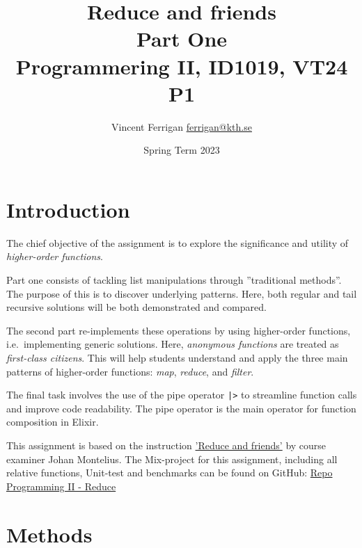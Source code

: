 \documentclass[a4paper,11pt]{article}
\begin{document}
\title{
    Reduce and friends
    \\Part One
\\\small{Programmering II, ID1019, VT24 P1}
}
\author{Vincent Ferrigan \href{mailto:ferrigan@kth.se}{ferrigan@kth.se}}

\date{Spring Term 2023}

\maketitle

\section*{Introduction}
\label{sec:introduction}
The chief objective of the assignment is to explore the significance and utility
of \emph{higher-order functions}.

Part one consists of tackling list manipulations through
''traditional methods''.
The purpose of this is to discover underlying patterns.
Here, both regular and tail recursive solutions will be both
demonstrated and compared.

The second part re-implements these operations by using higher-order functions,
i.e.\ implementing generic solutions.
Here, \emph{anonymous functions} are treated as \emph{first-class citizens}.
This will help students understand and apply the three main patterns of
higher-order functions: \emph{map}, \emph{reduce}, and \emph{filter}.

The final task involves the use of the pipe operator
\texttt{|>}
to streamline
function calls and improve code readability.
The pipe operator is the main operator for function composition in Elixir.

This assignment is based on the instruction
\href{https://people.kth.se/~johanmon/courses/id1019/seminars/reduce/reduce.pdf}{'Reduce and friends'}
by course examiner Johan Montelius.
The Mix-project for this assignment, including all relative functions, Unit-test and benchmarks can be found on GitHub:
\href{https://github.com/VincentFerrigan/kth-id1019-programming-ii/tree/main/tasks/4/reduce}{Repo Programming II - Reduce}%

\section*{Methods}
\label{sec:methods}
\end{document}
